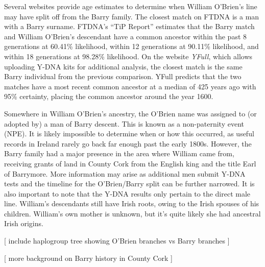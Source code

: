 Several websites provide age estimates to determine when William O'Bri\-en's line may have split off from the Barry family. The closest match on FTDNA is a man with a Barry surname. FTDNA's ``TiP Report'' estimates that the Barry match and William O'Brien's descendant have a common ancestor within the past 8 generations at 60.41\% likelihood, within 12 generations at 90.11\% likelihood, and within 18 generations at 98.28\% likelihood.\cite{TiP} On the website \textit{YFull}, which allows uploading Y-DNA kits for additional analysis, the closest match is the same Barry individual from the previous comparison. YFull predicts that the two matches have a most recent common ancestor at a median of 425 years ago with 95\% certainty, placing the common ancestor around the year 1600.\cite{YFull}

Somewhere in William O'Brien's ancestry, the O'Brien name was assigned to (or adopted by) a man of Barry descent. This is known as a non-paternity event (NPE). It is likely impossible to determine when or how this occurred, as useful records in Ireland rarely go back far enough past the early 1800s. However, the Barry family had a major presence in the area where William came from, receiving grants of land in County Cork from the English king and the title Earl of Barrymore.\cite{BarrymoreDNA3} More information may arise as additional men submit Y-DNA tests and the timeline for the O'Brien/Barry split can be further narrowed. It is also important to note that the Y-DNA results only pertain to the direct male line. William's descendants still have Irish roots, owing to the Irish spouses of his children. William's own mother is unknown, but it's quite likely she had ancestral Irish origins.

[ include haplogroup tree showing O'Brien branches vs Barry branches ]

[ more background on Barry history in County Cork ]